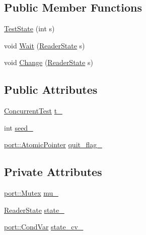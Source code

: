 \subsection*{Public Member Functions}
\begin{DoxyCompactItemize}
\item 
\hyperlink{classleveldb_1_1_test_state_a777f2182bef5c524d580dc26ec589c2d}{Test\+State} (int s)
\item 
void \hyperlink{classleveldb_1_1_test_state_ab11f5574ad50202e18e8274e16953f0a}{Wait} (\hyperlink{classleveldb_1_1_test_state_a1bf1f0a16815237ff1f29d2925d9a4ad}{Reader\+State} s)
\item 
void \hyperlink{classleveldb_1_1_test_state_ae63a695f700220714efa0e622511740c}{Change} (\hyperlink{classleveldb_1_1_test_state_a1bf1f0a16815237ff1f29d2925d9a4ad}{Reader\+State} s)
\end{DoxyCompactItemize}
\subsection*{Public Attributes}
\begin{DoxyCompactItemize}
\item 
\hyperlink{classleveldb_1_1_concurrent_test}{Concurrent\+Test} \hyperlink{classleveldb_1_1_test_state_a090fd0c59fb141c4843511b4020f05e9}{t\+\_\+}
\item 
int \hyperlink{classleveldb_1_1_test_state_aa44f519b574945b0061c88df42fd4725}{seed\+\_\+}
\item 
\hyperlink{classleveldb_1_1port_1_1_atomic_pointer}{port\+::\+Atomic\+Pointer} \hyperlink{classleveldb_1_1_test_state_a04e07cf69866e925db3fafd5cf9fa23f}{quit\+\_\+flag\+\_\+}
\end{DoxyCompactItemize}
\subsection*{Private Attributes}
\begin{DoxyCompactItemize}
\item 
\hyperlink{classleveldb_1_1port_1_1_mutex}{port\+::\+Mutex} \hyperlink{classleveldb_1_1_test_state_a52f2e84b88c3c8f7f958a2879dce5f59}{mu\+\_\+}
\item 
\hyperlink{classleveldb_1_1_test_state_a1bf1f0a16815237ff1f29d2925d9a4ad}{Reader\+State} \hyperlink{classleveldb_1_1_test_state_abfbcdedcb6b61445e42231a7d766dc3d}{state\+\_\+}
\item 
\hyperlink{classleveldb_1_1port_1_1_cond_var}{port\+::\+Cond\+Var} \hyperlink{classleveldb_1_1_test_state_a57e246c3b9588ae25bc647cf079e2cdd}{state\+\_\+cv\+\_\+}
\end{DoxyCompactItemize}


